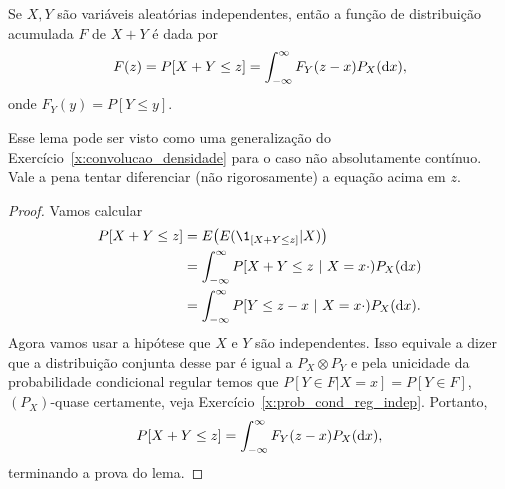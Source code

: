 \begin{proposition}
  Se $X, Y$ são variáveis aleatórias independentes, então a função de distribuição acumulada $F$ de $X + Y$ é dada por
  \begin{equation}
    F(z) = P[X + Y \leq z] = \int_{-\infty}^\infty F_Y(z - x) P_X (\mathop{}\!\mathrm{d} x),
  \end{equation}
  onde $F_Y(y) = P[Y \leq y]$.
\end{proposition}

Esse lema pode ser visto como uma generalização do Exercício~\ref{x:convolucao_densidade} para o caso não absolutamente contínuo.
Vale a pena tentar diferenciar (não rigorosamente) a equação acima em $z$.

\begin{proof}
  Vamos calcular
  \begin{equation}
    \begin{split}
      P[X + Y \leq z] & = E\big( E(\1_{[X + Y \leq z]} | X) \big)\\
      & = \int_{-\infty}^\infty P[X + Y \leq z \ | \ X = x\cdot) P_X(\dd x)\\
      & = \int_{-\infty}^\infty P[ Y \leq z-x  \ | \ X = x\cdot) P_X(\dd x).
     \end{split}
  \end{equation}
  Agora vamos usar a hipótese que $X$ e $Y$ são independentes.
  Isso equivale a dizer que a distribuição conjunta desse par é igual a $P_X \otimes P_Y$ e pela unicidade da probabilidade condicional regular 
  temos que $P[Y \in F | X = x] = P[Y \in F]$, $(P_X)$-quase certamente, veja Exercício~\ref{x:prob_cond_reg_indep}.
  Portanto,
  \begin{equation}
    P[X + Y \leq z] = \int_{-\infty}^\infty F_Y(z - x)  P_X (\mathop{}\!\mathrm{d} x),
  \end{equation}
  terminando a prova do lema.
\end{proof}


